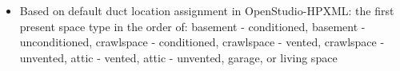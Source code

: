 \begin{itemize}
\item Based on default duct location assignment in OpenStudio-HPXML: the first present space type in the order of: basement - conditioned, basement - unconditioned, crawlspace - conditioned, crawlspace - vented, crawlspace - unvented, attic - vented, attic - unvented, garage, or living space
\end{itemize}
